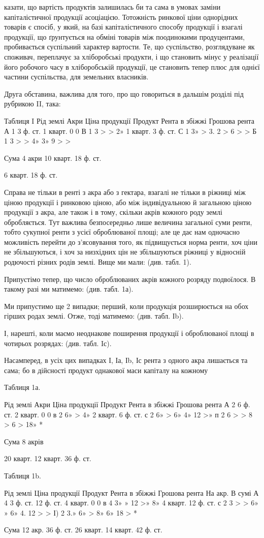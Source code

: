 казати, що вартість продуктів залишилась би та сама в умовах заміни капіталістичної
продукції асоціацією. Тотожність ринкової ціни однорідних товарів є
спосіб, у який, на базі капіталістичного способу продукції і взагалі продукції,
що ґрунтується на обміні товарів між поодинокими продуцентами, пробивається
суспільний характер вартости. Те, що суспільство, розглядуване як споживач,
переплачує за хліборобські продукти, і що становить мінус у реалізації його
робочого часу в хліборобській продукції, це становить тепер плюс для однієї
частини суспільства, для земельних власників.

Друга обставина, важлива для того, про що говориться в дальшім розділі
під рубрикою II, така:

Таблиця I
Рід  землі    Акри    Ціна  продукції    Продукт    Рента в збіжжі    Грошова  рента
А    1    3 ф. ст.    1 кварт.    0    0
В    1    3 > >    2» 1 кварт.    3 ф. ст.
С 1 3» > 3. 2 > 6 > >
Б 1 3 > > 4» 3» 9 > >

Сума 4 акри 10 кварт. 18 ф. ст.

6 кварт. 18 ф. ст.

Справа не тільки в ренті з акра або з гектара, взагалі не тільки в ріжниці
між ціною продукції і ринковою ціною, або між індивідуальною й загальною
ціною продукції з
акра, але також і в тому,
скільки акрів кожного
роду землі обробляється.
Тут важлива безпосередньо
лише величина загальної
суми ренти, тобто сукупної
ренти з усієї оброблюваної
площі; але це дає
нам одночасно можливість
перейти до з’ясовування
того, як підвищується норма
ренти, хоч ціни не
збільшуються, і хоч за
низхідних цін не збільшуються
ріжниці у відносній
родючості різних
родів землі. Вище ми мали:
(див. табл. 1).

Припустімо тепер,
що число оброблюваних
акрів кожного розряду подвоїлося.
В такому разі ми
матимемо: (див. табл. 1а).

Ми припустимо ще
2 випадки; перший, коли
продукція розширюється
на обох гірших родах землі.
Отже, тоді матимемо:
(див. табл. Іb).

І, нарешті, коли маємо
неоднакове поширення
продукції і оброблюваної
площі в чотирьох розрядах:
(див. табл. Iс).

Насамперед, в усіх
цих випадках І, Іа, Іb, Іс
рента з одного акра лишається
та сама; бо в
дійсності продукт однакової
маси капіталу на кожному

Таблиця 1а.

Рід  землі    Акри    Ціна  продукції    Продукт    Рента в збіжжі    Грошова  рента
А    2    6 ф. ст.    2 кварт.    0    0
в    2    6» >    4» 2 кварт.    6 ф. ст.
с    2    6» >    6» 4» 12 >»
п    2    6 > >    8 >    6 >    18» *

Сума 8 акрів

20 кварт. 12 кварт. 36 ф. ст.

Таблиця 1b.

Рід  землі    Ціна продукції        Продукт    Рента в збіжжі    Грошова  рента
        На  акр. В сумі
А    4    3 ф. ст.    12 ф. ст.    4 кварт.    0    0
в    4    3» »    12 >» 8» 4 кварт.    12 ф. ст.
с    2    3 > >    6» »    6» 4.    12 > >
І) 2 3.» 6» > 8» 6» 18 > *

Сума 12 акр. 36 ф. ст. 26 кварт. 14 кварт. 42 ф. ст.
